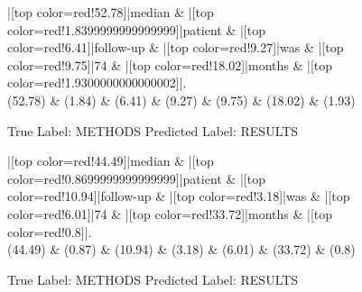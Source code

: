 \documentclass[a4paper, landscape]{article}
\begin{document}
\begin{figure}
\begin{center}
\begin{dependency}
\begin{deptext}
|[top color=red!52.78]|median \& |[top color=red!1.8399999999999999]|patient \& |[top color=red!6.41]|follow-up \& |[top color=red!9.27]|was \& |[top color=red!9.75]|74 \& |[top color=red!18.02]|months \& |[top color=red!1.9300000000000002]|.\\
(52.78) \& (1.84) \& (6.41) \& (9.27) \& (9.75) \& (18.02) \& (1.93)\\
\end{deptext}
\end{dependency}
\end{center}
\caption{True Label: METHODS Predicted Label: RESULTS}
\end{figure}
\clearpage
\begin{figure}
\begin{center}
\begin{dependency}
\begin{deptext}
|[top color=red!44.49]|median \& |[top color=red!0.8699999999999999]|patient \& |[top color=red!10.94]|follow-up \& |[top color=red!3.18]|was \& |[top color=red!6.01]|74 \& |[top color=red!33.72]|months \& |[top color=red!0.8]|.\\
(44.49) \& (0.87) \& (10.94) \& (3.18) \& (6.01) \& (33.72) \& (0.8)\\
\end{deptext}
\end{dependency}
\end{center}
\caption{True Label: METHODS Predicted Label: RESULTS}
\end{figure}
\clearpage
\end{document}
